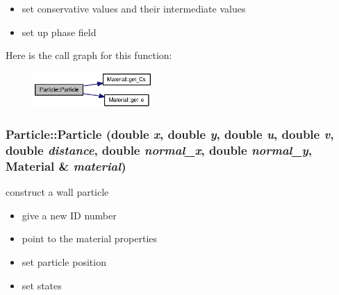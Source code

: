 \begin{itemize}
\item set conservative values and their intermediate values\end{itemize}


\begin{itemize}
\item set up phase field \end{itemize}


Here is the call graph for this function:\nopagebreak
\begin{figure}[H]
\begin{center}
\leavevmode
\includegraphics[width=128pt]{classParticle_5cf658952a598524638d789db59b4249_cgraph}
\end{center}
\end{figure}
\hypertarget{classParticle_141d53920868e51381f83b6a5d5973d2}{
\subsubsection[{Particle}]{\setlength{\rightskip}{0pt plus 5cm}Particle::Particle (double {\em x}, \/  double {\em y}, \/  double {\em u}, \/  double {\em v}, \/  double {\em distance}, \/  double {\em normal\_\-x}, \/  double {\em normal\_\-y}, \/  {\bf Material} \& {\em material})}}
\label{classParticle_141d53920868e51381f83b6a5d5973d2}


construct a wall particle 



\begin{itemize}
\item give a new ID number\end{itemize}


\begin{itemize}
\item point to the material properties\end{itemize}


\begin{itemize}
\item set particle position\end{itemize}


\begin{itemize}
\item set states\end{itemize}


